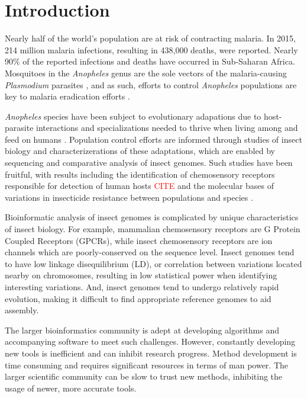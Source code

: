 \chapter{Introduction}

Nearly half of the world's population are at risk of contracting malaria.  In 2015, 214 million malaria infections, resulting in 438,000 deaths, were reported. Nearly 90\% of the reported infections and deaths have occurred in Sub-Saharan Africa.  Mosquitoes in the \emph{Anopheles} genus are the sole vectors of the malaria-causing \emph{Plasmodium} parasites \cite{Neafsey2015,Neafsey2010,Lawniczak2010}, and as such, efforts to control \emph{Anopheles} populations are key to malaria eradication efforts \cite{Holt2002}.

\emph{Anopheles} species have been subject to evolutionary adapations due to host-parasite interactions and specializations needed to thrive when living among and feed on humans \cite{Neafsey2015}. Population control efforts are informed through studies of insect biology and characterizerations of these adaptations, which are enabled by sequencing and comparative analysis of insect genomes.   Such studies have been fruitful, with results including the identification of chemosensory receptors responsible for detection of human hosts \textcolor{red}{CITE} and the molecular bases of variations in insecticide resistance between populations and species \cite{Lawniczak2010}.

Bioinformatic analysis of insect genomes is complicated by unique characteristics of insect biology.  For example, mammalian chemosensory receptors are G Protein Coupled Receptors (GPCRs), while insect chemosensory receptors are ion channels which are poorly-conserved on the sequence level.  Insect genomes tend to have low linkage disequilibrium (LD), or correlation  between variations located nearby on chromosomes, resulting in low statistical power when identifying interesting variations.  And, insect genomes tend to undergo relatively rapid evolution, making it difficult to find appropriate reference genomes to aid assembly.

The larger bioinformatics community is adept at developing algorithms and accompanying software to meet such challenges.  However, constantly developing new tools is inefficient and can inhibit research progress.  Method development is time consuming and requires significant resources in terms of man power.  The larger scientific community can be slow to trust new methods, inhibiting the usage of newer, more accurate tools.

